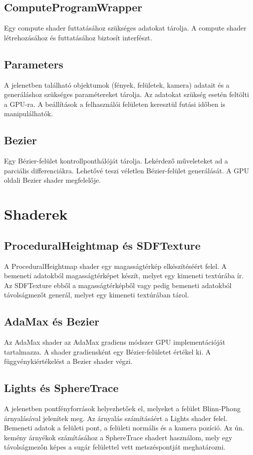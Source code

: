 \subsection{ComputeProgramWrapper}
Egy compute shader futtatásához szükséges adatokat tárolja. A compute shader létrehozásához és futtatásához biztosít interfészt.

\subsection{Parameters}
A jelenetben található objektumok (fények, felületek, kamera) adatait és a generáláshoz szükséges paramétereket tárolja. Az adatokat szükség esetén feltölti a GPU-ra. A beállítások a felhasználói felületen keresztül futási időben is manipulálhatók.

\subsection{Bezier}
Egy Bézier-felület kontrollponthálóját tárolja. Lekérdező műveleteket ad a parciális differenciákra. Lehetővé teszi véletlen Bézier-felület generálását. A GPU oldali Bezier shader megfelelője.


\section{Shaderek}

\subsection{ProceduralHeightmap és SDFTexture}
A ProceduralHeightmap shader egy magasságtérkép elkészítéséért felel. A bemeneti adatokból magasságtérképet készít, melyet egy kimeneti textúrába ír. Az SDFTexture ebből a magasságtérképből vagy pedig bemeneti adatokból távolságmezőt generál, melyet egy kimeneti textúrában tárol.

\subsection{AdaMax és Bezier}
Az AdaMax shader az AdaMax gradiens módszer GPU implementációját tartalmazza. A shader gradiensként egy Bézier-felületet értékel ki. A függvénykiértékelést a Bezier shader végzi.

\subsection{Lights és SphereTrace}
A jelenetben pontfényforrások helyezhetőek el, melyeket a felület Blinn-Phong árnyalásával jelenítek meg. Az árnyalás számításáért a Lights shader felel. Bemeneti adatok a felületi pont, a felületi normális és a kamera pozíció. Az ún. kemény árnyékok számításához a SphereTrace shadert használom, mely egy távolságmezőn képes a sugár felülettel vett metszéspontját meghatározni.


